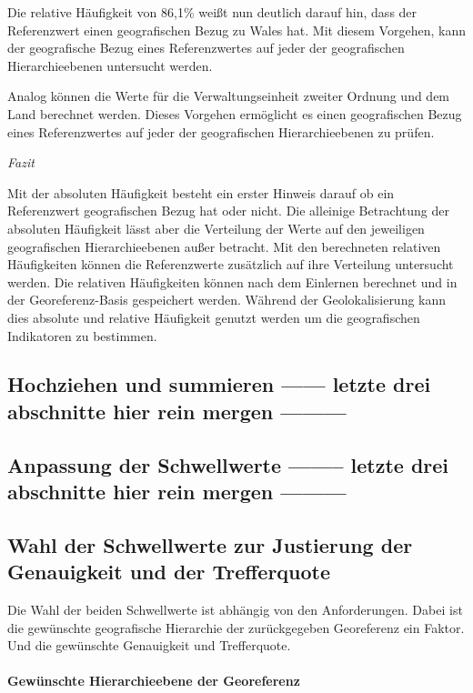 			Die relative Häufigkeit von 86,1\% weißt nun deutlich darauf hin, dass der Referenzwert einen geografischen Bezug zu Wales hat.
			Mit diesem Vorgehen, kann der geografische Bezug eines Referenzwertes auf jeder der geografischen Hierarchieebenen untersucht werden.

			Analog können die Werte für die Verwaltungseinheit zweiter Ordnung und dem Land berechnet werden.
			Dieses Vorgehen ermöglicht es einen geografischen Bezug eines Referenzwertes auf jeder der geografischen Hierarchieebenen zu prüfen.

		\textit{Fazit}

			Mit der absoluten Häufigkeit besteht ein erster Hinweis darauf ob ein Referenzwert geografischen Bezug hat oder nicht.
			Die alleinige Betrachtung der absoluten Häufigkeit lässt aber die Verteilung der Werte auf den jeweiligen geografischen Hierarchieebenen außer betracht.
			Mit den berechneten relativen Häufigkeiten können die Referenzwerte zusätzlich auf ihre Verteilung untersucht werden.
			Die relativen Häufigkeiten können nach dem Einlernen berechnet und in der Georeferenz-Basis gespeichert werden. 
			Während der Geolokalisierung kann dies absolute und relative Häufigkeit genutzt werden um die geografischen Indikatoren zu bestimmen. 

		\subsection{Hochziehen und summieren ------ letzte drei abschnitte hier rein mergen ---------}

		\subsection{Anpassung der Schwellwerte -------- letzte drei abschnitte hier rein mergen ---------}

		\subsection{Wahl der Schwellwerte zur Justierung der Genauigkeit und der Trefferquote}

			Die Wahl der beiden Schwellwerte ist abhängig von den Anforderungen.
			Dabei ist die gewünschte geografische Hierarchie der zurückgegeben Georeferenz ein Faktor.
			Und die gewünschte Genauigkeit und Trefferquote.
			
			\paragraph{Gewünschte Hierarchieebene der Georeferenz}

